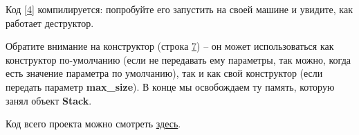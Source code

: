 \begin{lecture}[\lectureSubject]
\begin{lecSection}
\begin{lecSection}
			Код \ref{4} компилируется: попробуйте его запустить на своей машине и увидите, как работает деструктор.
		\end{lecSection}
		\begin{lecSection}
			Обратите внимание на конструктор (строка \underline{7}) -- он может использоваться как конструктор по-умолчанию (если не передавать ему параметры, так можно, когда есть значение параметра по умолчанию), так и как свой конструктор (если передать параметр \textbf{max\_size}). В конце мы освобождаем ту память, которую занял объект \textbf{Stack}.
		\end{lecSection}
	\end{lecSection}
	\begin{center}
	Код всего проекта можно смотреть \href{https://github.com/alekseik1/cpp\_lections\_2017/tree/master/lection\%209}{здесь}.
	\end{center}
\end{lecture}
